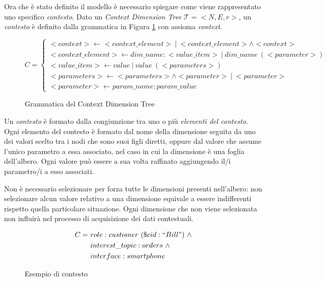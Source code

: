 Ora che è stato definito il modello è necessario spiegare come viene rappresentato uno specifico \emph{contesto}. Dato un \emph{Context Dimension Tree} $\mathcal{T} = {<}N, E, r{>} $, un \emph{contesto} è definito dalla grammatica in Figura \ref{fig:grammatica-cdt} con assioma \emph{context}.

\begin{figure}[ht]
	\begin{equation*}
	C =
	\begin{cases}
		{<}context{>} \leftarrow {<}context\_element{>}\ |\ {<}context\_element{>} \land {<}context{>}\\
		{<}context\_element{>} \leftarrow dim\_name: {<}value\_item{>}\ |\ dim\_name\ ({<}parameter{>})\\
		{<}value\_item{>} \leftarrow value\ |\ value\ ({<}parameters{>})\\
		{<}parameters{>} \leftarrow {<}parameters{>} \land {<}parameter{>}\ |\ {<}parameter{>}\\
		{<}parameter{>} \leftarrow param\_name: param\_value
	\end{cases}
	\end{equation*}
	\caption{Grammatica del Context Dimension Tree}\label{fig:grammatica-cdt}
\end{figure}

Un \emph{contesto} è formato dalla congiunzione tra uno o più \emph{elementi del contesto}. Ogni elemento del contesto è formato dal nome della dimensione seguita da uno dei valori scelto tra i nodi che sono suoi figli diretti, oppure dal valore che assume l'unico parametro a essa associato, nel caso in cui la dimensione è una foglia dell'albero. Ogni valore può essere a sua volta raffinato aggiungendo il/i parametro/i a esso associati.

Non è necessario selezionare per forza tutte le dimensioni presenti nell'albero: non selezionare alcun valore relativo a una dimensione equivale a essere indifferenti rispetto quella particolare situazione. Ogni dimensione che non viene selezionata non influirà nel processo di acquisizione dei dati contestuali.

\begin{figure}[ht]
	\begin{align*}
		C =\ &role : customer\ (\$cid : ``Bill")\ \land \\
			&interest\_topic : orders\ \land \\
			&interface : smartphone
	\end{align*}
	\caption{Esempio di contesto}\label{fig:esempio-contesto-base}
\end{figure}

